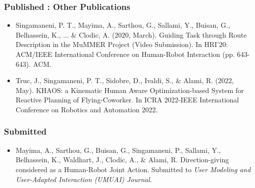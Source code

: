 \subsubsection*{Published : Other Publications}
\begin{itemize}

\item Singamaneni, P. T., Mayima, A., Sarthou, G., Sallami, Y., Buisan, G., Belhassein, K., ... \& Clodic, A. (2020, March). Guiding Task through Route Description in the MuMMER Project (Video Submission). In HRI'20: ACM/IEEE International Conference on Human-Robot Interaction (pp. 643-643). ACM.

\item Truc, J., Singamaneni, P. T., Sidobre, D., Ivaldi, S., \& Alami, R. (2022, May). KHAOS: a Kinematic Human Aware Optimization-based System for Reactive Planning of Flying-Coworker. In ICRA 2022-IEEE International Conference on Robotics and Automation 2022.
\end{itemize}

\subsubsection*{Submitted}

\begin{itemize}
\item Mayima, A., Sarthou, G., Buisan, G., Singamaneni, P., Sallami, Y., Belhassein, K., Waldhart, J., Clodic, A., \& Alami, R. Direction-giving considered as a Human-Robot Joint Action. Submitted to \textit{User Modeling and User-Adapted Interaction (UMUAI) Journal}.
\end{itemize}